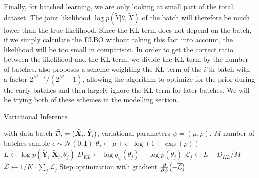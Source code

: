 Finally, for batched learning, we are only looking at small part of the total dataset.
The joint likelihood $\log p(\tilde{Y}|\theta,\tilde{X})$ of the batch will therefore be much lower than the true likelihood. 
Since the KL term does not depend on the batch, if we simply calculate the ELBO without taking this fact into account, the likelihood will be too small in comparison.
In order to get the correct ratio between the likelihood and the KL term, we divide the KL term by the number of batches. 
\cite{blundell_weight_2015} also proposes a scheme weighting the KL term of the $i$'th batch with a factor $2^{M-i}/(2^{M}-1)$, allowing the algorithm to optimize for the prior during the early batches and then largely ignore the KL term for later batches. 
We will be trying both of these schemes in the modelling section.

\begin{algorithm}[htbp]
    \caption{Variational Inference} \label{alg:vi}
    \begin{algorithmic}
        \State with data batch $\tilde{\mathcal{D}}_i =(\tilde{\bm{X}}_i, \tilde{\bm{Y}}_i)$, variational parameters $\psi = (\mu, \rho)$, $M$ number of batches
            \State sample $\epsilon \sim \mathcal{N}(0, \bm{I})$
            \State $\theta_j \gets \mu + \epsilon \cdot \log(1+\exp(\rho))$
            \State 
            $L \gets 
            \log{p(\tilde{\bm{Y}}_i|\tilde{\bm{X}}_i,\theta_j)}$
            \State $D_{KL} \gets \log q_\psi(\theta_j) - \log{p(\theta_j)}$
            \State $\mathcal{L}_j \gets L - D_{KL}/M $
        \EndFor
        \State $\overline{\mathcal{L}} \gets 1/K\cdot \sum_j \mathcal{L}_j$
        \State Step optimization with gradient $\pdv{\psi} (-\overline{\mathcal{L}})$
        \EndFor
    \end{algorithmic}
\end{algorithm}